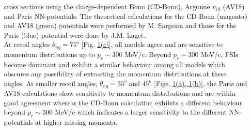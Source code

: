 cross sections using the charge-dependent Bonn (CD-Bonn)\cite{PhysRevC.63.024001}, Argonne $v_{18}$ (AV18)\cite{PhysRevC.51.38} and Paris\cite{PhysRevC.21.861} NN-potentials. The theoretical calculations
for the CD-Bonn (magenta) and AV18 (green) potentials were performed by M. Sargsian\cite{PhysRevC.82.014612} and those for the Paris (blue) potential were done by J.M. Laget\cite{LAGET2005}. \\
\indent At recoil angles $\theta_{nq}=75^{o}$ [Fig. \hyperref[fig:fig1]{1(c)}], all models agree and are sensitive to momentum distributions up to $p_{r}\sim$300 MeV/c. Beyond $p_{r}\sim$300 MeV/c, FSIs become
dominant and exhibit a similar behaviour among all models which obscures any possibility of extracting the momentum distributions at these angles. At smaller recoil angles, $\theta_{nq}=35^{o}$ and $45^{o}$ 
[Figs. \hyperref[fig:fig1]{1(a), 1(b)}], the Paris and AV18 calculations show sensitivity to momentum distributions and are within good agreement whereas the CD-Bonn calculation exhibits
a different behaviour beyond $p_{r}\sim$300 MeV/c which indicates a larger sensitivity to the different NN-potentials at higher missing momenta. 


